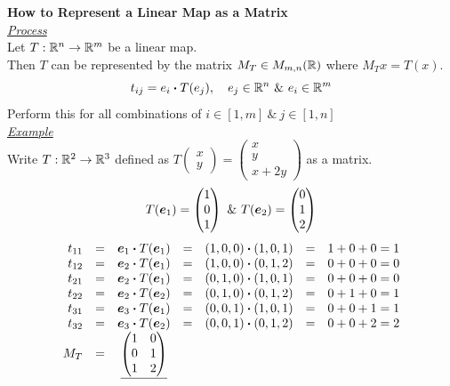 \documentclass[11pt,a4paper]{article}
\begin{document}
\newpage\textbf{How to Represent a Linear Map as a Matrix}\\

\underline{\textit{Process}}\\
Let $T : \mathbb{R}^n \to \mathbb{R}^m$ be a linear map.\\
Then $T$ can be represented by the matrix $M_T \in M_{m, n}(\mathbb{R})$ where $M_Tx = T(x)$.
$$t_{ij} = e_i \boldsymbol{\cdot} T(e_j),\quad e_j \in \mathbb{R}^n\ \&\ e_i \in \mathbb{R}^m$$
Perform this for all combinations of $i \in [1, m]\ \&\ j \in [1, n]$\\

\underline{\textit{Example}}\\
Write $T : \mathbb{R}^2 \to \mathbb{R}^3$ defined as $T\begin{pmatrix} x \\ y \end{pmatrix} = \begin{pmatrix} x \\ y \\ x+2y \end{pmatrix}$ as a matrix.
\[T(\boldsymbol{e}_1) = \begin{pmatrix} 1 \\ 0 \\ 1 \end{pmatrix}\ \&\ T(\boldsymbol{e}_2) = \begin{pmatrix} 0 \\ 1 \\ 2 \end{pmatrix}\]
\[\begin{array}{rcccclcl}
t_{11} &=& \boldsymbol{e}_1 \boldsymbol{\cdot} T(\boldsymbol{e}_1) &=& (1, 0, 0) \boldsymbol{\cdot} (1, 0 ,1) &=& 1 + 0 + 0 = 1\\
t_{12} &=& \boldsymbol{e}_2 \boldsymbol{\cdot} T(\boldsymbol{e}_1) &=& (1, 0, 0) \boldsymbol{\cdot} (0, 1 ,2) &=& 0 + 0 + 0 = 0\\
t_{21} &=& \boldsymbol{e}_2 \boldsymbol{\cdot} T(\boldsymbol{e}_1) &=& (0, 1, 0) \boldsymbol{\cdot} (1, 0 ,1) &=& 0 + 0 + 0 = 0\\
t_{22} &=& \boldsymbol{e}_2 \boldsymbol{\cdot} T(\boldsymbol{e}_2) &=& (0, 1, 0) \boldsymbol{\cdot} (0, 1 ,2) &=& 0 + 1 + 0 = 1\\
t_{31} &=& \boldsymbol{e}_3 \boldsymbol{\cdot} T(\boldsymbol{e}_1) &=& (0, 0, 1) \boldsymbol{\cdot} (1, 0 ,1) &=& 0 + 0 + 1 = 1\\
t_{32} &=& \boldsymbol{e}_3 \boldsymbol{\cdot} T(\boldsymbol{e}_2) &=& (0, 0, 1) \boldsymbol{\cdot} (0, 1 ,2) &=& 0 + 0 + 2 = 2\\
M_T &=& \underline{\begin{pmatrix} 1 & 0 \\ 0 & 1 \\ 1 & 2\end{pmatrix}}
\end{array}\]
\end{document}
